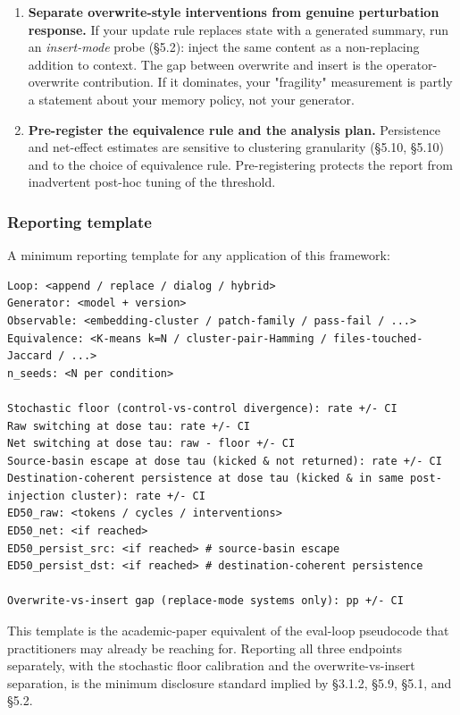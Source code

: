 \documentclass{article}
\newenvironment{codeblock}[1][]{%
  \par\addvspace{2pt}%
  \ifstrempty{#1}{}{\noindent\textit{\small #1}\par\nobreak\addvspace{2pt}}%
  \begingroup\footnotesize\begin{mdframed}[style=codestyle]%
}{%
  \end{mdframed}\endgroup\par%
}
\theoremstyle{plain}
\theoremstyle{definition}
\begin{document}
\begin{enumerate}
  \item \textbf{Separate overwrite-style interventions from genuine perturbation response.} If your update rule replaces state with a generated summary, run an \textit{insert-mode} probe (§5.2): inject the same content as a non-replacing addition to context. The gap between overwrite and insert is the operator-overwrite contribution. If it dominates, your "fragility" measurement is partly a statement about your memory policy, not your generator.

  \item \textbf{Pre-register the equivalence rule and the analysis plan.} Persistence and net-effect estimates are sensitive to clustering granularity (§5.10, §5.10) and to the choice of equivalence rule. Pre-registering protects the report from inadvertent post-hoc tuning of the threshold.
\end{enumerate}

\subsubsection*{Reporting template}

A minimum reporting template for any application of this framework:

\begin{codeblock}
\begin{verbatim}
Loop: <append / replace / dialog / hybrid>
Generator: <model + version>
Observable: <embedding-cluster / patch-family / pass-fail / ...>
Equivalence: <K-means k=N / cluster-pair-Hamming / files-touched-Jaccard / ...>
n_seeds: <N per condition>

Stochastic floor (control-vs-control divergence): rate +/- CI
Raw switching at dose tau: rate +/- CI
Net switching at dose tau: raw - floor +/- CI
Source-basin escape at dose tau (kicked & not returned): rate +/- CI
Destination-coherent persistence at dose tau (kicked & in same post-injection cluster): rate +/- CI
ED50_raw: <tokens / cycles / interventions>
ED50_net: <if reached>
ED50_persist_src: <if reached> # source-basin escape
ED50_persist_dst: <if reached> # destination-coherent persistence

Overwrite-vs-insert gap (replace-mode systems only): pp +/- CI
\end{verbatim}
\end{codeblock}

This template is the academic-paper equivalent of the eval-loop pseudocode that practitioners may already be reaching for. Reporting all three endpoints separately, with the stochastic floor calibration and the overwrite-vs-insert separation, is the minimum disclosure standard implied by §3.1.2, §5.9, §5.1, and §5.2.
\end{document}
